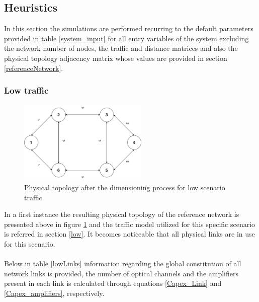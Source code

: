 \vspace{11pt}

\subsection{Heuristics}
\label{heuResults}
\vspace{11pt}

In this section the simulations are performed recurring to the default parameters provided in table \ref{system_input} for all entry variables of the system excluding the network number of nodes, the traffic and distance matrices and also the physical topology adjacency matrix whose values are provided in section \ref{referenceNetwork}.
\subsubsection{Low traffic}


\begin{figure}[H]
  \begin{center}
    \includegraphics[width=0.55\textwidth]{fig/logos/lowPhysicalTopology.pdf}
    \caption{Physical topology after the dimensioning process for low scenario traffic.}
  \end{center}
  \label{lowPhysicalTopology}
\end{figure}

In a first instance the resulting physical topology of the reference network is presented above in figure \ref{lowPhysicalTopology} and the traffic model utilized for this specific scenario is referred in section \ref{low}. It becomes noticeable that all physical links are in use for this scenario.\\ \\

Below in table \ref{lowLinks} information regarding the global constitution of all network links is provided, the number of optical channels and the amplifiers present in each link is calculated through equations \ref{Capex_Link} and \ref{Capex_amplifiers}, respectively. 

